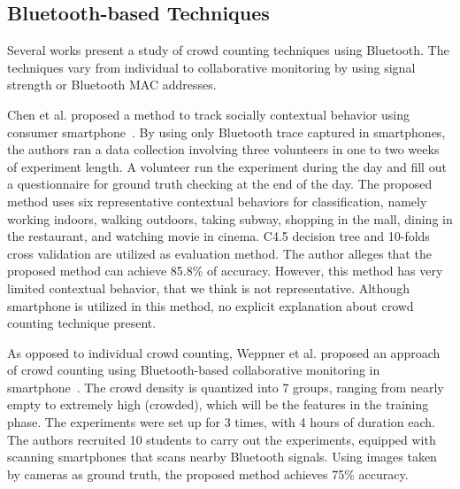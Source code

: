 	

	



	


	

	

	

	










	\subsection{Bluetooth-based Techniques} %
	\label{sub:bluetooth-based-techniques}
	Several works present a study of crowd counting techniques using Bluetooth. The techniques vary from individual to collaborative monitoring by using signal strength or Bluetooth \ac{MAC} addresses. 

	Chen et al. proposed a method to track socially contextual behavior using consumer smartphone~\cite{thesis028}. By using only Bluetooth trace captured in smartphones, the authors ran a data collection involving three volunteers in one to two weeks of experiment length. A volunteer run the experiment during the day and fill out a questionnaire for ground truth checking at the end of the day. The proposed method uses six representative contextual behaviors for classification, namely working indoors, walking outdoors, taking subway, shopping in the mall, dining in the restaurant, and watching movie in cinema.
	C4.5 decision tree and 10-folds cross validation are utilized as evaluation method. The author alleges that the proposed method can achieve 85.8\% of accuracy. However, this method has very limited contextual behavior, that we think is not representative. Although smartphone is utilized in this method, no explicit explanation about crowd counting technique present.

	As opposed to individual crowd counting, Weppner et al. proposed an approach of crowd counting using Bluetooth-based collaborative monitoring in smartphone~\cite{thesis008}. The crowd density is quantized into 7 groups, ranging from nearly empty to extremely high (crowded), which will be the features in the training phase. The experiments were set up for 3 times, with 4 hours of duration each. The authors recruited 10 students to carry out the experiments, equipped with scanning smartphones that scans nearby Bluetooth signals. Using images taken by cameras as ground truth, the proposed method achieves 75\% accuracy.
	

